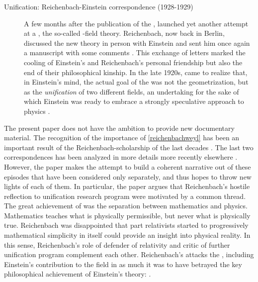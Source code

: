 \documentclass[draft]{article}
\newcommand{\PRZL}{\citetitle{Reichenbach1928}\xspace}
\newcommand{\FP}{\german{Fernparallelismus}\xspace}
\begin{document}
\begin{description}
\item[Unification: Reichenbach-Einstein correspondence (1928-1929)]\label{reichenbacheinsteinII}   A few months after the publication of the \PRZL \citep{Reichenbach1928}, \citet{Einstein19281,Einstein19282} launched yet another attempt at a \uft, the so-called \FP-field theory. Reichenbach, now back in Berlin, discussed the new theory in person with Einstein and sent him once again a manuscript with some comments \citep{Reichenbach1928b}. This exchange of letters marked the cooling of Einstein's and Reichenbach's personal friendship but also the end of their philosophical kinship. In the late 1920s, \citet{Reichenbach1929a,Reichenbach1929b,Reichenbach1929c} came to realize that, in Einstein's mind, the actual goal of the \uftp was not the geometrization, but as the \emph{unification} of two different fields, an undertaking for the sake of which Einstein was ready to embrace a strongly speculative approach to physics \citep{Dongen2010}.  
\end{description}

The present paper does not have the ambition to provide new documentary material. The recognition of the importance of \cref{reichenbachweyl} has been an important result of the Reichenbach-scholarship of the last decades \citep{Ryckman1995,Ryckman1996}. The last two correspondences has been analyzed in more details more recently elsewhere \citep{Giovanelli2016d,Giovanelli2022}. However, the paper makes the attempt to build a coherent narrative out of these episodes that have been considered only separately, and thus hopes to throw new lights of each of them. In particular, the paper argues that Reichenbach's hostile reflection to unification research program were motivated by a common thread. The great achievement of \gr was the separation between mathematics and physics. Mathematics teaches what is physically permissible, but never what is physically true. Reichenbach was disappointed  that part relativists started to progressively mathematical simplicity in itself could provide an insight into physical reality. In this sense, Reichenbach's role of defender of relativity and critic of further unification program complement each other. Reichenbach's attacks the \uftp, including Einstein's contribution to the field in as much it was to have betrayed the key philosophical achievement of Einstein's theory:  \citep[11]{Reichenbach1929}.   
\end{document}
